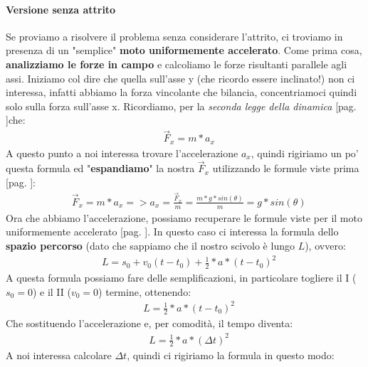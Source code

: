             \paragraph{Versione senza attrito}
                Se proviamo a risolvere il problema senza considerare l'attrito, ci troviamo in presenza di un "semplice" \textbf{moto uniformemente accelerato}. Come prima cosa, \textbf{analizziamo le forze in campo} e calcoliamo le forze risultanti parallele agli assi. Iniziamo col dire che quella sull'asse y (che ricordo essere inclinato!) non ci interessa, infatti abbiamo la forza vincolante che bilancia, concentriamoci quindi solo sulla forza sull'asse x. Ricordiamo, per la \textit{seconda legge della dinamica} [pag. \pageref{II_legge_dinamica}]che:
                \begin{align*}
                    &\vec{F}_x = m*a_x
                \end{align*}
                A questo punto a noi interessa trovare l'accelerazione $a_x$, quindi rigiriamo un po' questa formula ed "\textbf{espandiamo}" la nostra $\vec{F}_x$ utilizzando le formule viste prima [pag. \pageref{Risultanti_piano_inclinato}]:
                \begin{align*}
                    &\vec{F}_x = m*a_x => a_x = \frac{\vec{F}_x}{m} = \frac{m * g * sin(\theta)}{m} = g * sin(\theta)
                \end{align*}
                Ora che abbiamo l'accelerazione, possiamo recuperare le formule viste per il moto uniformemente accelerato [pag. \pageref{Formule_moto_unif_acc}]. In questo caso ci interessa la formula dello \textbf{spazio percorso} (dato che sappiamo che il nostro scivolo è lungo $L$), ovvero:
                \begin{align*}
                    &L = s_0+v_0(t-t_0)+\frac{1}{2}*a*(t-t_0)^2
                \end{align*}
                A questa formula possiamo fare delle semplificazioni, in particolare togliere il I ($s_0 = 0$) e il II ($v_0 = 0$) termine, ottenendo:
                \begin{align*}
                    &L = \frac{1}{2}*a*(t-t_0)^2
                \end{align*}
                Che sostituendo l'accelerazione e, per comodità, il tempo diventa:
                \begin{align*}
                    &L = \frac{1}{2}*a*(\Delta t)^2
                \end{align*}
                A noi interessa calcolare $\Delta t$, quindi ci rigiriamo la formula in questo modo:
